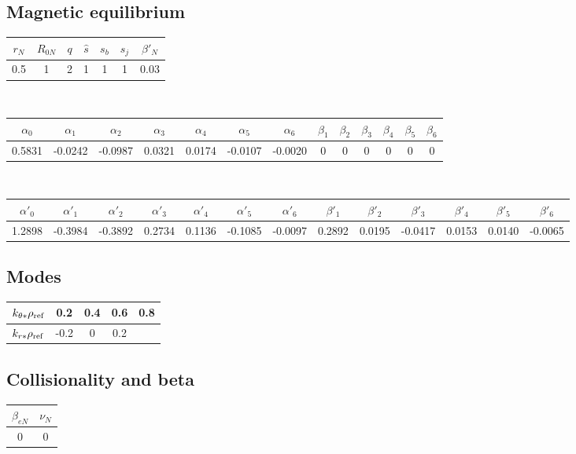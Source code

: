 \documentclass[fleqn]{report}
\begin{document}
\subsection{Magnetic equilibrium}
\begin{tabular}{c c c c c c c}
\hline
$r_N$ & $R_{0N}$ & $q$ & $\hat{s}$ & $s_b$ & $s_j$ & $\beta'_N$ \\ [0.5ex]
\hline
0.5 & 1 & 2 & 1 & 1 & 1 & 0.03 \\
\hline
\end{tabular}\\
\begin{tabular}{c c c c c c c c c c c c c}
\hline
$\alpha_0$ & $\alpha_1$ & $\alpha_2$ & $\alpha_3$ & $\alpha_4$ & $\alpha_5$ & $\alpha_6$ 
& $\beta_1$ & $\beta_2$ & $\beta_3$ & $\beta_4$ & $\beta_5$ & $\beta_6$   \\ [0.5ex]
\hline
 0.5831 & -0.0242 & -0.0987 & 0.0321 & 0.0174 & -0.0107 & -0.0020 & 0 & 0 & 0 & 0 & 0 & 0 \\
\hline
\end{tabular}\\
\begin{tabular}{c c c c c c c c c c c c c}
\hline
$\alpha'_0$ & $\alpha'_1$ & $\alpha'_2$ & $\alpha'_3$ & $\alpha'_4$ & $\alpha'_5$ & $\alpha'_6$ 
& $\beta'_1$ & $\beta'_2$ & $\beta'_3$ & $\beta'_4$ & $\beta'_5$ & $\beta'_6$   \\ [0.5ex]
\hline
1.2898 & -0.3984 & -0.3892 & 0.2734 & 0.1136 & -0.1085  & -0.0097 & 0.2892 & 0.0195 & -0.0417  & 0.0153 & 0.0140 & -0.0065 \\
\hline
\end{tabular}

\subsection{Modes}
\begin{tabular}{c c c c c}
\hline
$k_{\theta*}\rho_{\textrm{ref}}$ & 0.2 & 0.4 & 0.6 & 0.8 \\ [0.5ex]
\hline
$k_{r*}\rho_{\textrm{ref}}$ & -0.2 & 0  & 0.2  &  \\ [0.5ex]
\hline
\end{tabular}

\subsection{Collisionality and beta}
\begin{tabular}{c c}
\hline
 $\beta_{eN}$ & $\nu_N$ \\ [0.5ex]
\hline
0 & 0 \\ [0.5ex]
\hline
\end{tabular}



\end{document}
